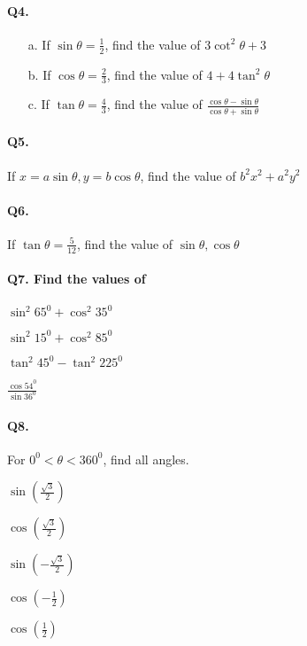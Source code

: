 \documentclass{article}
\begin{document}
\paragraph{Q4.}
\begin{enumerate}
  \item[a.] If $\sin\theta = \frac{1}{2}$, find the value of $3\cot^{2}\theta+3$
  \item[b.] If $\cos\theta = \frac{2}{3}$, find the value of $4+4\tan^{2}\theta$
  \item[c.] If $\tan\theta = \frac{4}{3}$, find the value of $\frac{\cos\theta - \sin\theta}{\cos\theta + \sin\theta}$
\end{enumerate}

\paragraph{Q5.}
If $x = a\sin\theta, y = b\cos\theta$, find the value of $b^{2}x^{2}+a^{2}y^{2}$

\paragraph{Q6.}
If $\tan\theta = \frac{5}{12}$, find the value of $\sin\theta, \cos\theta$

\paragraph{Q7. Find the values of}
\begin{enumerate*}[label=\alph*.]
          \item $\sin^{2}65^{0} + \cos^{2}35^{0}$
          \item $\sin^{2}15^{0} + \cos^{2}85^{0}$
          \item $\tan^{2}45^{0} - \tan^{2}225^{0}$
          \item $\frac{\cos54^{0}}{\sin36^{0}}$
\end{enumerate*}

\paragraph{Q8.}
For $0^{0}<\theta<360^{0}$, find all angles.

\begin{enumerate*}[label=\alph*.]
          \item $\sin(\frac{\sqrt{3}}{2})$
          \item $\cos(\frac{\sqrt{3}}{2})$
          \item $\sin(-\frac{\sqrt{3}}{2})$
          \item $\cos(-\frac{1}{2})$
          \item $\cos(\frac{1}{2})$
\end{enumerate*}
\end{document}
